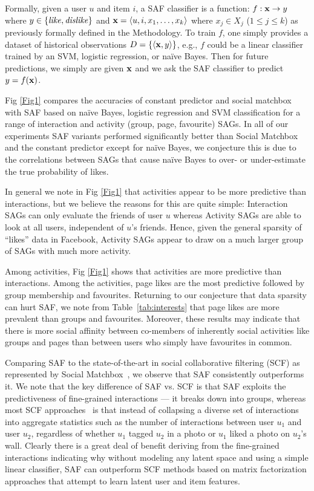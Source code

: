 Formally, given a user $u$ and item $i$, a SAF classifier is a
function: $f: \x \to y$ where $y \in \{ \like, \dislike \}$ and $\x =
\langle u,i,x_1,\ldots,x_k \rangle$ where $x_j \in X_j$ ($1 \leq j
\leq k$) as previously formally defined in the Methodology.  To train $f$, one
simply provides a dataset of historical observations $D = \{ \langle
\x,y \rangle \}$, e.g., $f$ could be a linear classifier trained by an
SVM, logistic regression, or na\"{i}ve Bayes.  Then for future
predictions, we simply are given $\x$ and we ask the SAF classifier to
predict $y = f(\x)$.

Fig \ref{Fig1} compares the accuracies of constant predictor and
social matchbox with SAF based on na\"{i}ve Bayes, logistic regression
and SVM classification for a range of interaction and activity (group,
page, favourite) SAGs.  In all of our experiments SAF variants
performed significantly better than Social Matchbox and the constant
predictor except for na\"{i}ve Bayes, we conjecture this is due to the
correlations between SAGs that cause na\"{i}ve Bayes to over- or
under-estimate the true probability of likes.

In general we note in Fig \ref{Fig1} that activities appear to be
more predictive than interactions, but we believe the reasons for this
are quite simple: Interaction SAGs can only evaluate the friends of
user $u$ whereas Activity SAGs are able to look at all users,
independent of $u$'s friends.
Hence, given the general sparsity of ``likes'' data in Facebook, 
Activity SAGs appear to draw on a much larger group of SAGs
with much more activity.

Among activities, Fig \ref{Fig1} shows that activities are more
predictive than interactions. Among the activities, page likes are the
most predictive followed by group membership and favourites.
Returning to our conjecture that data sparsity can hurt SAF, we note
from Table~\ref{tab:interests} that page likes are more prevalent than
groups and favourites.  Moreover, these results may indicate that
there is more social affinity between co-members of inherently social
activities like groups and pages than between users who simply have
favourites in common.

Comparing SAF to the state-of-the-art in social
collaborative filtering (SCF) as represented by Social
Matchbox~\cite{Noel2012NOF}, we observe that SAF consistently
outperforms it.  We note that the key difference of SAF vs. SCF is
that SAF exploits the predictiveness of fine-grained interactions ---
it breaks down into groups, whereas most SCF
approaches~\cite{Noel2012NOF,lla,socinf,sr,rrmf,sorec,ste} is that
instead of collapsing a diverse set of interactions into aggregate
statistics such as the number of interactions between user $u_1$ and
user $u_2$, regardless of whether $u_1$ tagged $u_2$ in a photo or
$u_1$ liked a photo on $u_2$'s wall.  Clearly there is a great deal of
benefit deriving from the fine-grained interactions indicating why
without modeling any latent space and using a simple linear
classifier, SAF can outperform SCF methods based on matrix
factorization approaches that attempt to learn latent user and item
features.

